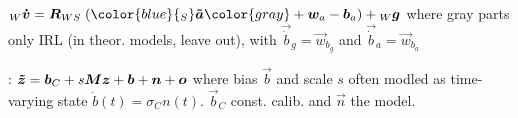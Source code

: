     ${_W}\vec{\dot{v}} = \mat{R}_{WS}\; ({\color{blue}{_S}\vec{\tilde{a}}} {\color{gray} + \vec{w}_a - \vec{b}_a}) + {_W}\vec{g}$
    where {\color{gray} gray parts} only IRL (in theor. models, leave out), with $\vec{\dot{b}}_g = \vec{w}_{b_g}$ and $\vec{\dot{b}}_a = \vec{w}_{b_a}$

: $\bm{\tilde{z}} = \bm{b}_C + s\bm{M}\bm{z} + \bm{b} + \bm{n} + \bm{o}$
where bias $\vec{b}$ and scale $s$ often modled as time-varying state $\dot{b}(t) = \sigma_C n(t)$.
$\vec{b}_C$ const. calib. and $\vec{n}$ the model.
